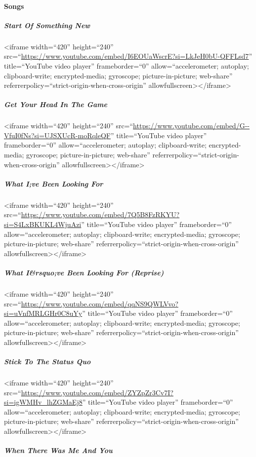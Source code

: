 \documentclass[11pt]{article}
\begin{document}
\paragraph*{Songs}
\label{sec:org132b196}

\subparagraph*{Start Of Something New}
\label{sec:org1129b27}

<iframe width=``420'' height=``240'' src=``\url{https://www.youtube.com/embed/I6EOUaWscrE?si=LkJeH0bU-QFFLsd7}'' title=``YouTube video player'' frameborder=``0'' allow=``accelerometer; autoplay; clipboard-write; encrypted-media; gyroscope; picture-in-picture; web-share'' referrerpolicy=``strict-origin-when-cross-origin'' allowfullscreen></iframe>
\subparagraph*{Get Your Head In The Game}
\label{sec:org8a2ed0b}

<iframe width=``420'' height=``240''
src=``\url{https://www.youtube.com/embed/G--VfuI0fNs?si=UJSXUcR-moRqleQF}'' title=``YouTube video player'' frameborder=``0'' allow=``accelerometer; autoplay; clipboard-write; encrypted-media; gyroscope; picture-in-picture; web-share'' referrerpolicy=``strict-origin-when-cross-origin'' allowfullscreen></iframe>
\subparagraph*{What I;ve Been Looking For}
\label{sec:orgc0c50a4}

<iframe width=``420'' height=``240''
src=``\url{https://www.youtube.com/embed/7Q5B8FzRKYU?si=S4LxBKUKL4WjuAzi}'' title=``YouTube video player'' frameborder=``0'' allow=``accelerometer; autoplay; clipboard-write; encrypted-media; gyroscope; picture-in-picture; web-share'' referrerpolicy=``strict-origin-when-cross-origin'' allowfullscreen></iframe>
\subparagraph*{What I\&rsquo;ve Been Looking For (Reprise)}
\label{sec:org243523a}

<iframe width=``420'' height=``240''
src=``\url{https://www.youtube.com/embed/qqNS9QWLVvo?si=uVnfMRLGHr0C8uYy}'' title=``YouTube video player'' frameborder=``0'' allow=``accelerometer; autoplay; clipboard-write; encrypted-media; gyroscope; picture-in-picture; web-share'' referrerpolicy=``strict-origin-when-cross-origin'' allowfullscreen></iframe>
\subparagraph*{Stick To The Status Quo}
\label{sec:orgc413635}

<iframe width=``420'' height=``240''
src=``\url{https://www.youtube.com/embed/ZYZpZr3Cv7I?si=igWMHv\_lhZGMaEj8}'' title=``YouTube video player'' frameborder=``0'' allow=``accelerometer; autoplay; clipboard-write; encrypted-media; gyroscope; picture-in-picture; web-share'' referrerpolicy=``strict-origin-when-cross-origin'' allowfullscreen></iframe>
\subparagraph*{When There Was Me And You}
\label{sec:orgbcc21f5}
\end{document}
